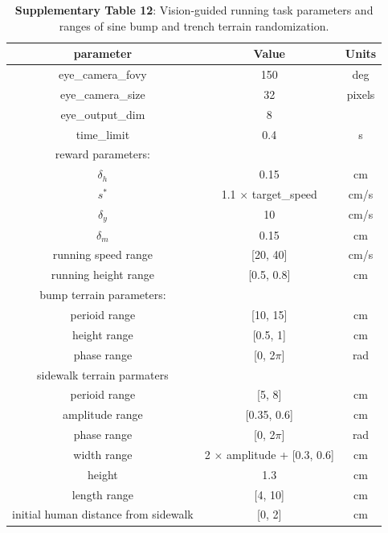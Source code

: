 \documentclass[sn-mathphys-num]{sn-jnl}%
\theoremstyle{thmstyleone}	%
\theoremstyle{thmstyletwo}	%
\theoremstyle{thmstylethree}	%
\begin{document}
\begin{appendices}
\begin{table}[htbp]
	\centering
	\small
	\caption{\textbf{Supplementary Table 12}: 
		Vision-guided running task parameters and ranges of sine bump and trench terrain randomization.
	}
	\begin{tabular}{ccc}
		\toprule
		\textbf{parameter}        &        \textbf{Value}  & \textbf{Units}   \\
		\midrule
		eye\_camera\_fovy     &  150     &  deg \\
		eye\_camera\_size     &  32     &  pixels \\
		eye\_output\_dim     &  8     &   \\
		time\_limit     &  0.4     &  s \\
		\midrule
		reward parameters:     &       &   \\
		$ \delta_h $     &   0.15    &  cm \\
		$ s^{*} $     &   1.1 $ \times $ target\_speed    &  cm/s \\
		$ \delta_y $     &   10    &  cm/s \\
		$ \delta_m $     &   0.15    &  cm \\
		\midrule
		running speed range     &   [20, 40]    &  cm/s \\
		running height range     &   [0.5, 0.8]    &  cm \\
		\midrule
		bump terrain parameters:     &       &   \\
		\quad perioid range     &   [10, 15]    &  cm \\
		\quad height range     &   [0.5, 1]    &  cm \\
		\quad phase range     &   [0, 2$ \pi $]    &  rad \\
		\midrule
		sidewalk terrain parmaters     &       &   \\
		\quad perioid range     &   [5, 8]    &  cm \\
		\quad amplitude range     &   [0.35, 0.6]    &  cm \\
		\quad phase range     &   [0, 2$ \pi $]    &  rad \\
		\quad width range     &   2 $ \times $ amplitude + [0.3, 0.6]    &  cm \\
		\quad height     &   1.3    &  cm \\
		\quad length range     &   [4, 10]    &  cm \\
		\quad initial human distance from sidewalk     &   [0, 2]    &  cm \\
		\bottomrule
	\end{tabular}%
	\label{tab:s_12}%
\end{table}%




\end{appendices}
\end{document}
